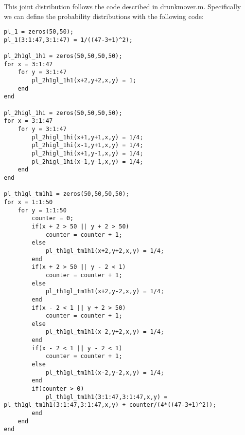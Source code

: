 \documentclass[11pt,a4paper,oneside]{report}
\begin{document}
	This joint distribution follows the code described in drunkmover.m. Specifically we can define the probability distributions with the following code:

\begin{lstlisting}
pl_1 = zeros(50,50);
pl_1(3:1:47,3:1:47) = 1/((47-3+1)^2);

pl_2h1gl_1h1 = zeros(50,50,50,50);
for x = 3:1:47
    for y = 3:1:47
        pl_2h1gl_1h1(x+2,y+2,x,y) = 1;
    end
end

pl_2higl_1hi = zeros(50,50,50,50);
for x = 3:1:47
    for y = 3:1:47
        pl_2higl_1hi(x+1,y+1,x,y) = 1/4;
        pl_2higl_1hi(x-1,y+1,x,y) = 1/4;
        pl_2higl_1hi(x+1,y-1,x,y) = 1/4;
        pl_2higl_1hi(x-1,y-1,x,y) = 1/4;
    end
end

pl_th1gl_tm1h1 = zeros(50,50,50,50);
for x = 1:1:50
    for y = 1:1:50
        counter = 0;
        if(x + 2 > 50 || y + 2 > 50)
            counter = counter + 1;
        else
            pl_th1gl_tm1h1(x+2,y+2,x,y) = 1/4;
        end
        if(x + 2 > 50 || y - 2 < 1)
            counter = counter + 1;
        else
            pl_th1gl_tm1h1(x+2,y-2,x,y) = 1/4;
        end
        if(x - 2 < 1 || y + 2 > 50)
            counter = counter + 1;
        else
            pl_th1gl_tm1h1(x-2,y+2,x,y) = 1/4;
        end
        if(x - 2 < 1 || y - 2 < 1)
            counter = counter + 1;
        else
            pl_th1gl_tm1h1(x-2,y-2,x,y) = 1/4;
        end
        if(counter > 0)
            pl_th1gl_tm1h1(3:1:47,3:1:47,x,y) = pl_th1gl_tm1h1(3:1:47,3:1:47,x,y) + counter/(4*((47-3+1)^2));
        end
    end
end


\end{lstlisting}
\end{document}
